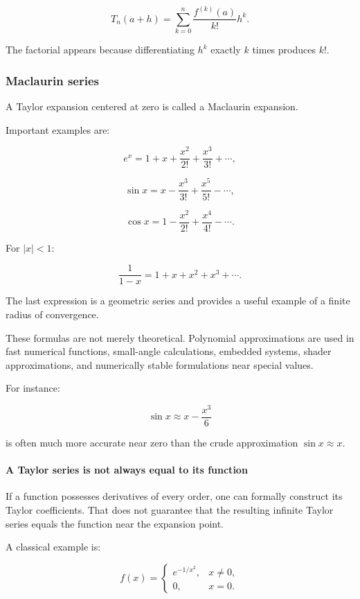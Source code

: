 \[
\boxed{ T_n(a+h)= \sum_{k=0}^{n} \frac{f^{(k)}(a)}{k!}h^k }.
\]

The factorial appears because differentiating \(h^k\) exactly \(k\) times produces \(k!\).

\subsubsection{Maclaurin series}\label{02-foundations-ii-ch021-maclaurin-series}

A Taylor expansion centered at zero is called a Maclaurin expansion.

Important examples are:

\[
e^x= 1+x+\frac{x^2}{2!}+\frac{x^3}{3!}+\cdots,
\]

\[
\sin x= x-\frac{x^3}{3!}+\frac{x^5}{5!}-\cdots,
\]

\[
\cos x= 1-\frac{x^2}{2!}+\frac{x^4}{4!}-\cdots.
\]

For \(|x|<1\):

\[
\frac1{1-x} = 1+x+x^2+x^3+\cdots.
\]

The last expression is a geometric series and provides a useful example of a finite radius of convergence.

These formulas are not merely theoretical. Polynomial approximations are used in fast numerical functions, small-angle calculations, embedded systems, shader approximations, and numerically stable formulations near special values.

For instance:

\[
\sin x\approx x-\frac{x^3}{6}
\]

is often much more accurate near zero than the crude approximation \(\sin x\approx x\).

\paragraph{A Taylor series is not always equal to its function}\label{02-foundations-ii-ch021-a-taylor-series-is-not-always-equal-to-its-function}

If a function possesses derivatives of every order, one can formally construct its Taylor coefficients. That does not guarantee that the resulting infinite Taylor series equals the function near the expansion point.

A classical example is:

\[
f(x)= \begin{cases} e^{-1/x^2},&x\ne0,\\ 0,&x=0. \end{cases}
\]

